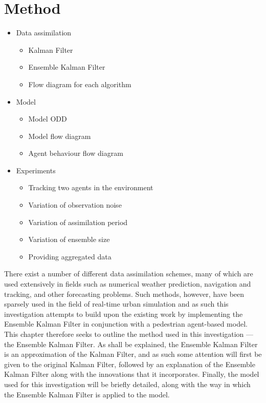 \section{Method}\label{sec:method}

\begin{itemize}
    \item Data assimilation
    \begin{itemize}
        \item Kalman Filter
        \item Ensemble Kalman Filter
        \item Flow diagram for each algorithm
    \end{itemize}
    \item Model
    \begin{itemize}
        \item Model ODD
        \item Model flow diagram
        \item Agent behaviour flow diagram
    \end{itemize}
    \item Experiments
    \begin{itemize}
        \item Tracking two agents in the environment
        \item Variation of observation noise
        \item Variation of assimilation period
        \item Variation of ensemble size
        \item Providing aggregated data
    \end{itemize}
\end{itemize}

There exist a number of different data assimilation schemes, many of which are
used extensively in fields such as numerical weather prediction, navigation and
tracking, and other forecasting problems.
Such methods, however, have been sparsely used in the field of real-time urban
simulation and as such this investigation attempts to build upon the existing
work by implementing the Ensemble Kalman Filter in conjunction with a pedestrian
agent-based model.
This chapter therefore seeks to outline the method used in this investigation --- the
Ensemble Kalman Filter. 
As shall be explained, the Ensemble Kalman Filter is an approximation of the
Kalman Filter, and as such some attention will first be given to the original
Kalman Filter, followed by an explanation of the Ensemble Kalman Filter along
with the innovations that it incorporates.
Finally, the model used for this investigation will be briefly detailed, along
with the way in which the Ensemble Kalman Filter is applied to the model.

